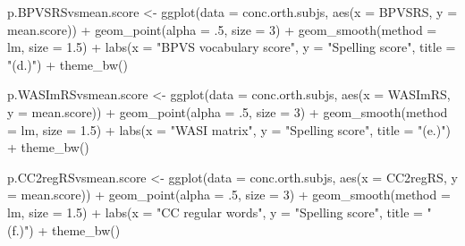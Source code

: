 \documentclass[
  letterpaper,
  DIV=11,
  numbers=noendperiod]{scrreprt}
\newenvironment{Shaded}{\begin{snugshade}}{\end{snugshade}}
\newcommand{\AttributeTok}[1]{\textcolor[rgb]{0.40,0.45,0.13}{#1}}
\newcommand{\DecValTok}[1]{\textcolor[rgb]{0.68,0.00,0.00}{#1}}
\newcommand{\FloatTok}[1]{\textcolor[rgb]{0.68,0.00,0.00}{#1}}
\newcommand{\FunctionTok}[1]{\textcolor[rgb]{0.28,0.35,0.67}{#1}}
\newcommand{\NormalTok}[1]{\textcolor[rgb]{0.00,0.23,0.31}{#1}}
\newcommand{\OtherTok}[1]{\textcolor[rgb]{0.00,0.23,0.31}{#1}}
\newcommand{\SpecialCharTok}[1]{\textcolor[rgb]{0.37,0.37,0.37}{#1}}
\newcommand{\StringTok}[1]{\textcolor[rgb]{0.13,0.47,0.30}{#1}}
\begin{document}
\begin{Shaded}
\begin{Highlighting}[]
\NormalTok{p.BPVSRSvsmean.score }\OtherTok{\textless{}{-}} \FunctionTok{ggplot}\NormalTok{(}\AttributeTok{data =}\NormalTok{ conc.orth.subjs, }
                              \FunctionTok{aes}\NormalTok{(}\AttributeTok{x =}\NormalTok{ BPVSRS, }
                                  \AttributeTok{y =}\NormalTok{ mean.score)) }\SpecialCharTok{+}
  \FunctionTok{geom\_point}\NormalTok{(}\AttributeTok{alpha =}\NormalTok{ .}\DecValTok{5}\NormalTok{, }\AttributeTok{size =} \DecValTok{3}\NormalTok{) }\SpecialCharTok{+}
  \FunctionTok{geom\_smooth}\NormalTok{(}\AttributeTok{method =} \StringTok{\textquotesingle{}lm\textquotesingle{}}\NormalTok{, }\AttributeTok{size =} \FloatTok{1.5}\NormalTok{) }\SpecialCharTok{+}
  \FunctionTok{labs}\NormalTok{(}\AttributeTok{x =} \StringTok{"BPVS vocabulary score"}\NormalTok{, }
       \AttributeTok{y =} \StringTok{"Spelling score"}\NormalTok{,}
       \AttributeTok{title =} \StringTok{"(d.)"}\NormalTok{) }\SpecialCharTok{+}
  \FunctionTok{theme\_bw}\NormalTok{()}

\NormalTok{p.WASImRSvsmean.score }\OtherTok{\textless{}{-}} \FunctionTok{ggplot}\NormalTok{(}\AttributeTok{data =}\NormalTok{ conc.orth.subjs, }
                              \FunctionTok{aes}\NormalTok{(}\AttributeTok{x =}\NormalTok{ WASImRS, }
                                  \AttributeTok{y =}\NormalTok{ mean.score)) }\SpecialCharTok{+}
  \FunctionTok{geom\_point}\NormalTok{(}\AttributeTok{alpha =}\NormalTok{ .}\DecValTok{5}\NormalTok{, }\AttributeTok{size =} \DecValTok{3}\NormalTok{) }\SpecialCharTok{+}
  \FunctionTok{geom\_smooth}\NormalTok{(}\AttributeTok{method =} \StringTok{\textquotesingle{}lm\textquotesingle{}}\NormalTok{, }\AttributeTok{size =} \FloatTok{1.5}\NormalTok{) }\SpecialCharTok{+}
  \FunctionTok{labs}\NormalTok{(}\AttributeTok{x =} \StringTok{"WASI matrix"}\NormalTok{, }
       \AttributeTok{y =} \StringTok{"Spelling score"}\NormalTok{,}
       \AttributeTok{title =} \StringTok{"(e.)"}\NormalTok{) }\SpecialCharTok{+}
  \FunctionTok{theme\_bw}\NormalTok{()}

\NormalTok{p.CC2regRSvsmean.score }\OtherTok{\textless{}{-}} \FunctionTok{ggplot}\NormalTok{(}\AttributeTok{data =}\NormalTok{ conc.orth.subjs, }
                              \FunctionTok{aes}\NormalTok{(}\AttributeTok{x =}\NormalTok{ CC2regRS, }
                                  \AttributeTok{y =}\NormalTok{ mean.score)) }\SpecialCharTok{+}
  \FunctionTok{geom\_point}\NormalTok{(}\AttributeTok{alpha =}\NormalTok{ .}\DecValTok{5}\NormalTok{, }\AttributeTok{size =} \DecValTok{3}\NormalTok{) }\SpecialCharTok{+}
  \FunctionTok{geom\_smooth}\NormalTok{(}\AttributeTok{method =} \StringTok{\textquotesingle{}lm\textquotesingle{}}\NormalTok{, }\AttributeTok{size =} \FloatTok{1.5}\NormalTok{) }\SpecialCharTok{+}
  \FunctionTok{labs}\NormalTok{(}\AttributeTok{x =} \StringTok{"CC regular words"}\NormalTok{, }
       \AttributeTok{y =} \StringTok{"Spelling score"}\NormalTok{,}
       \AttributeTok{title =} \StringTok{"(f.)"}\NormalTok{) }\SpecialCharTok{+}
  \FunctionTok{theme\_bw}\NormalTok{()}


\end{Highlighting}
\end{Shaded}
\end{document}
